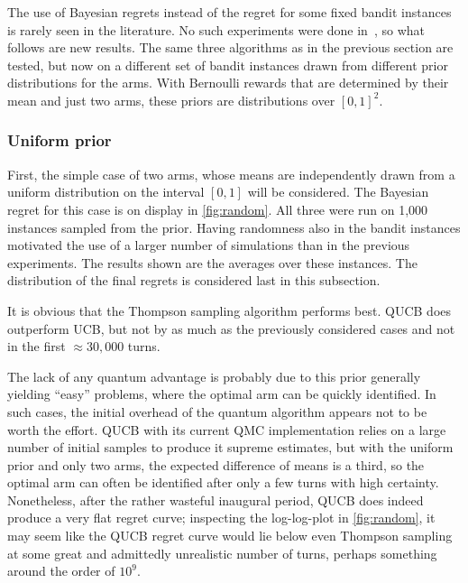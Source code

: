 The use of Bayesian regrets instead of the regret for some fixed bandit instances is rarely seen in the literature.
No such experiments were done in~\autocite{wan2022}, so what follows are new results.
The same three algorithms as in the previous section are tested, but now on a different set of bandit instances drawn from different prior distributions for the arms.
With Bernoulli rewards that are determined by their mean and just two arms, these priors are distributions over $[0, 1]^2$.


\subsubsection{Uniform prior}
First, the simple case of two arms, whose means are independently drawn from a uniform distribution on the interval $[0, 1]$ will be considered.
The Bayesian regret for this case is on display in \cref{fig:random}.
All three were run on 1,000 instances sampled from the prior.
Having randomness also in the bandit instances motivated the use of a larger number of simulations than in the previous experiments.
The results shown are the averages over these instances.
The distribution of the final regrets is considered last in this subsection.

It is obvious that the Thompson sampling algorithm performs best.
QUCB does outperform UCB, but not by as much as the previously considered cases and not in the first $\approx 30,000$ turns.

The lack of any quantum advantage is probably due to this prior generally yielding \enquote{easy} problems, where the optimal arm can be quickly identified.
In such cases, the initial overhead of the quantum algorithm appears not to be worth the effort.
QUCB with its current QMC implementation relies on a large number of initial samples to produce it supreme estimates, but with the uniform prior and only two arms, the expected difference of means is a third, so the optimal arm can often be identified after only a few turns with high certainty.
Nonetheless, after the rather wasteful inaugural period, QUCB does indeed produce a very flat regret curve; inspecting the log-log-plot in \cref{fig:random}, it may seem like the QUCB regret curve would lie below even Thompson sampling at some great and admittedly unrealistic number of turns, perhaps something around the order of $10^{9}$.



